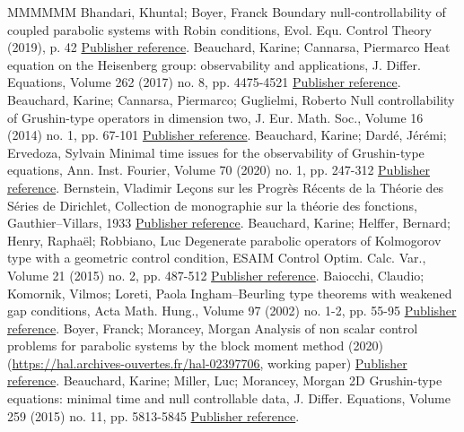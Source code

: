 \documentclass[11pt]{article}
\theoremstyle{definition}
\numberwithin{equation}{section}
\numberwithin{figure}{section}
\numberwithin{table}{section}
\begin{document}
\begin{thebibliography}{MMMMMM}
 Bhandari, Khuntal; Boyer, Franck Boundary null-controllability of coupled parabolic systems with Robin conditions, Evol. Equ. Control Theory (2019), p. 42 \href{https://ahl.centre-mersenne.org/item/AHL_2020__3__717_0/#BoyerBhandari:2019}{Publisher reference}.
 Beauchard, Karine; Cannarsa, Piermarco Heat equation on the Heisenberg group: observability and applications, J. Differ. Equations, Volume 262 (2017) no. 8, pp. 4475-4521 \href{https://ahl.centre-mersenne.org/item/AHL_2020__3__717_0/#BeauchardCannarsa17}{Publisher reference}.
 Beauchard, Karine; Cannarsa, Piermarco; Guglielmi, Roberto Null controllability of Grushin-type operators in dimension two, J. Eur. Math. Soc., Volume 16 (2014) no. 1, pp. 67-101 \href{https://ahl.centre-mersenne.org/item/AHL_2020__3__717_0/#BeauchardCannarsaGuglielmi}{Publisher reference}.
 Beauchard, Karine; Dardé, Jérémi; Ervedoza, Sylvain Minimal time issues for the observability of Grushin-type equations, Ann. Inst. Fourier, Volume 70 (2020) no. 1, pp. 247-312 \href{https://ahl.centre-mersenne.org/item/AHL_2020__3__717_0/#BeauchardDardeErvedoza}{Publisher reference}.
 Bernstein, Vladimir Leçons sur les Progrès Récents de la Théorie des Séries de Dirichlet, Collection de monographie sur la théorie des fonctions, Gauthier–Villars, 1933 \href{https://ahl.centre-mersenne.org/item/AHL_2020__3__717_0/#Bernstein33}{Publisher reference}.
 Beauchard, Karine; Helffer, Bernard; Henry, Raphaël; Robbiano, Luc Degenerate parabolic operators of Kolmogorov type with a geometric control condition, ESAIM Control Optim. Calc. Var., Volume 21 (2015) no. 2, pp. 487-512 \href{https://ahl.centre-mersenne.org/item/AHL_2020__3__717_0/#BHHR_Kolmogorov}{Publisher reference}.
 Baiocchi, Claudio; Komornik, Vilmos; Loreti, Paola Ingham–Beurling type theorems with weakened gap conditions, Acta Math. Hung., Volume 97 (2002) no. 1-2, pp. 55-95 \href{https://ahl.centre-mersenne.org/item/AHL_2020__3__717_0/#BaiocchiKomornikLoreti:2002}{Publisher reference}.
 Boyer, Franck; Morancey, Morgan Analysis of non scalar control problems for parabolic systems by the block moment method (2020) (\url{https://hal.archives-ouvertes.fr/hal-02397706,} working paper) \href{https://ahl.centre-mersenne.org/item/AHL_2020__3__717_0/#BoyerMorancey}{Publisher reference}.
 Beauchard, Karine; Miller, Luc; Morancey, Morgan 2D Grushin-type equations: minimal time and null controllable data, J. Differ. Equations, Volume 259 (2015) no. 11, pp. 5813-5845 \href{https://ahl.centre-mersenne.org/item/AHL_2020__3__717_0/#BeauchardMillerMorancey_Tmin}{Publisher reference}.

\end{thebibliography}
\end{document}
